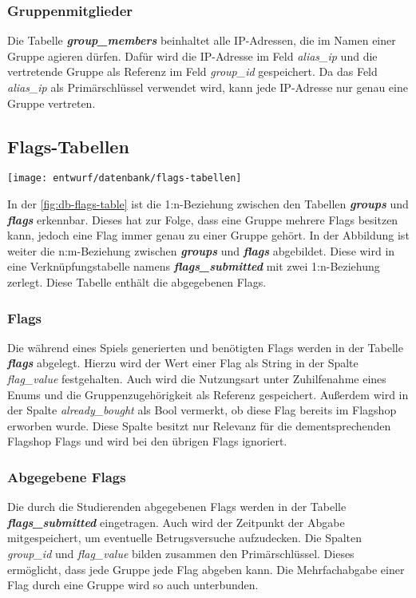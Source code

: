 \subsubsection{Gruppenmitglieder}
Die Tabelle \textbf{\textit{group\_members}} beinhaltet alle IP-Adressen, die im Namen einer Gruppe agieren dürfen. Dafür wird die IP-Adresse im Feld \textit{alias\_ip} und die vertretende Gruppe als Referenz im Feld \textit{group\_id} gespeichert. Da das Feld \textit{alias\_ip} als Primärschlüssel verwendet wird, kann jede IP-Adresse nur genau eine Gruppe vertreten.

\subsection{Flags-Tabellen}
\begin{center}
	\texttt{[image: entwurf/datenbank/flags-tabellen]}
	\label{fig:db-flags-table}
\end{center}


In der \autoref{fig:db-flags-table} ist die 1:n-Beziehung zwischen den Tabellen \textbf{\textit{groups}} und \textbf{\textit{flags}} erkennbar. Dieses hat zur Folge, dass eine Gruppe mehrere Flags besitzen kann, jedoch eine Flag immer genau zu einer Gruppe gehört. In der Abbildung ist weiter die n:m-Beziehung zwischen \textbf{\textit{groups}} und \textbf{\textit{flags}} abgebildet. Diese wird in eine Verknüpfungstabelle namens \textbf{\textit{flags\_submitted}} mit zwei 1:n-Beziehung zerlegt. Diese Tabelle enthält die abgegebenen Flags.
 
\subsubsection{Flags}
Die während eines Spiels generierten und benötigten Flags werden in der Tabelle \textbf{\textit{flags}} abgelegt. Hierzu wird der Wert einer Flag als String in der Spalte \textit{flag\_value} festgehalten. Auch wird die Nutzungsart unter Zuhilfenahme eines Enums und die Gruppenzugehörigkeit als Referenz gespeichert. Außerdem wird in der Spalte \textit{already\_bought} als Bool vermerkt, ob diese Flag bereits im Flagshop erworben wurde. Diese Spalte besitzt nur Relevanz für die dementsprechenden Flagshop Flags und wird bei den übrigen Flags ignoriert.

\subsubsection{Abgegebene Flags}
Die durch die Studierenden abgegebenen Flags werden in der Tabelle \textbf{\textit{flags\_submitted}} eingetragen. Auch wird der Zeitpunkt der Abgabe mitgespeichert, um eventuelle Betrugsversuche aufzudecken. Die Spalten \textit{group\_id} und \textit{flag\_value} bilden zusammen den Primärschlüssel. Dieses ermöglicht, dass jede Gruppe jede Flag abgeben kann. Die Mehrfachabgabe einer Flag durch eine Gruppe wird so auch unterbunden.

